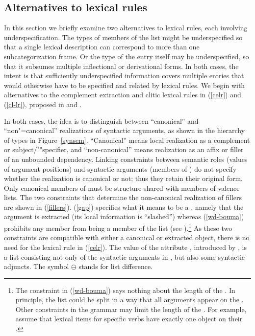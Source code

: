 \documentclass[output=paper,biblatex,babelshorthands,newtxmath,draftmode,colorlinks,citecolor=brown]{langscibook}
\begin{document}
\subsection{Alternatives to lexical rules}
\label{sec:alt}

In this section we briefly examine two alternatives to lexical rules, each involving underspecification. The types of members of the  list might be underspecified so that a single lexical description can correspond to more than one subcategorization frame. Or the type of the entry itself may be underspecified, so that it subsumes multiple inflectional or derivational forms. In both cases, the intent is that sufficiently underspecified information covers multiple entries that would otherwise have to be specified and related by lexical rules. We begin with alternatives to the complement extraction and clitic lexical rules in (\ref{celr}) and (\ref{cl-lr}), proposed in  and .%

In both cases, the idea is to distinguish between ``canonical'' and ``non"=canonical'' realizations of syntactic arguments, as shown in the hierarchy of
 types in Figure~\ref{synsem}. ``Canonical'' means local realization as a complement or
subject/""specifier, and ``non-canonical'' means realization as an affix or filler of an unbounded
dependency. Linking constraints between semantic roles (values of argument positions)
and syntactic arguments (members of ) do not specify whether the realization is
canonical or not; thus they retain their original form. Only canonical members of  must
be structure-shared with members of valence lists. The two constraints that determine the
non-canonical realization of fillers are shown in (\ref{fillers}). (\ref{gap}) specifies what it means to be a , namely that the
argument is extracted (its local information is ``slashed'') whereas (\ref{wd-bouma}) prohibits any
 member from being a member of the  list (see
\citealt*[23]{Boumaetal2001}).\footnote{%
The constraint in (\ref{wd-bouma}) says nothing about the length of the \subjl. In principle, the \deps list
could be split in a way that all arguments appear on the \subjl.  Other constraints in the
grammar may limit the length of the \subjl. For example, \citet[24]{Boumaetal2001} assume that lexical items for
specific  verbs have exactly one  object on their \subjl.
} As these two constraints are compatible with either a canonical or
extracted object, there is no need for the lexical rule in (\ref{celr}). The value of the attribute , introduced by \citeauthor{Boumaetal2001}, is a list consisting not only of the syntactic arguments in , but also some syntactic adjuncts.  The symbol $\ominus$\is{$\ominus$} stands for list difference.
\end{document}
